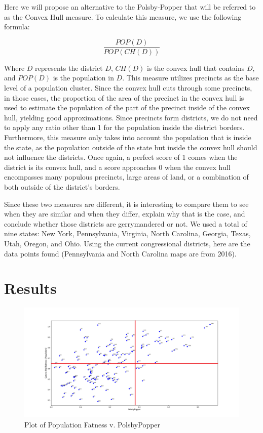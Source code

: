 \documentclass[letterpaper]{article}
\begin{document}
Here we will propose an alternative to the Polsby-Popper that will be referred to as the Convex Hull measure. To calculate this measure, we use the following formula:

\[
	\frac{POP(D)}{POP(CH(D))}
\]

Where $D$ represents the district $D$, $CH(D)$ is the convex hull that contains $D$, and $POP(D)$ is the population in $D$. This measure utilizes precincts as the base level of a population cluster. Since the convex hull cuts through some precincts, in those cases, the proportion of the area of the precinct in the convex hull is used to estimate the population of the part of the precinct inside of the convex hull, yielding good approximations. Since precincts form districts, we do not need to apply any ratio other than 1 for the population inside the district borders. Furthermore, this measure only takes into account the population that is inside the state, as the population outside of the state but inside the convex hull should not influence the districts. Once again, a perfect score of 1 comes when the district is its convex hull, and a score approaches 0 when the convex hull encompasses many populous precincts, large areas of land, or a combination of both outside of the district's borders.


Since these two measures are different, it is interesting to compare them to see when they are similar and when they differ, explain why that is the case, and conclude whether those districts are gerrymandered or not. We used a total of nine states: New York, Pennsylvania, Virginia, North Carolina, Georgia, Texas, Utah, Oregon, and Ohio. Using the current congressional districts, here are the data points found (Pennsylvania and North Carolina maps are from 2016).

\section{Results}

\begin{figure}[H]
	\includegraphics[width=\linewidth]{./figures/convexHullPopulationFatnessVPP2Edited.png}
	\caption{Plot of Population Fatness v. PolsbyPopper}
	\label{fig:datapoints}
\end{figure}
\end{document}
